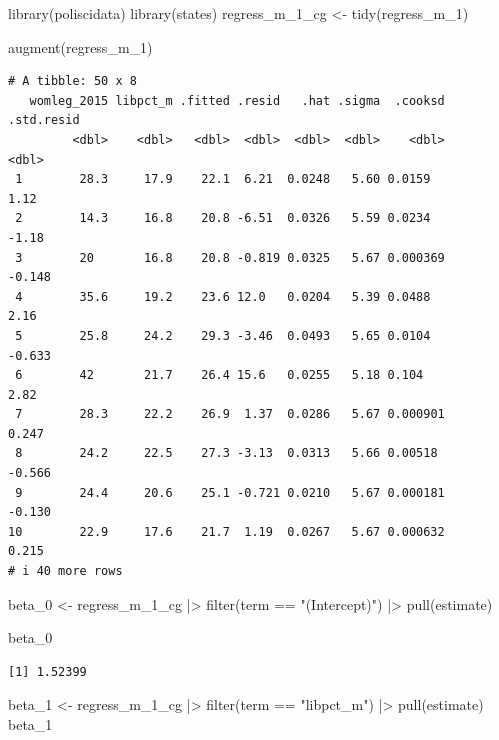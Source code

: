 \documentclass[
  letterpaper,
  DIV=11,
  numbers=noendperiod]{scrartcl}
\newenvironment{Shaded}{\begin{snugshade}}{\end{snugshade}}
\newcommand{\FunctionTok}[1]{\textcolor[rgb]{0.28,0.35,0.67}{#1}}
\newcommand{\NormalTok}[1]{\textcolor[rgb]{0.00,0.23,0.31}{#1}}
\newcommand{\OtherTok}[1]{\textcolor[rgb]{0.00,0.23,0.31}{#1}}
\newcommand{\SpecialCharTok}[1]{\textcolor[rgb]{0.37,0.37,0.37}{#1}}
\newcommand{\StringTok}[1]{\textcolor[rgb]{0.13,0.47,0.30}{#1}}
\begin{document}
\begin{Shaded}
\begin{Highlighting}[]
\FunctionTok{library}\NormalTok{(poliscidata)}
\FunctionTok{library}\NormalTok{(states)}
\NormalTok{regress\_m\_1\_cg }\OtherTok{\textless{}{-}} \FunctionTok{tidy}\NormalTok{(regress\_m\_1)}

\FunctionTok{augment}\NormalTok{(regress\_m\_1)}
\end{Highlighting}
\end{Shaded}

\begin{verbatim}
# A tibble: 50 x 8
   womleg_2015 libpct_m .fitted .resid   .hat .sigma  .cooksd .std.resid
         <dbl>    <dbl>   <dbl>  <dbl>  <dbl>  <dbl>    <dbl>      <dbl>
 1        28.3     17.9    22.1  6.21  0.0248   5.60 0.0159        1.12 
 2        14.3     16.8    20.8 -6.51  0.0326   5.59 0.0234       -1.18 
 3        20       16.8    20.8 -0.819 0.0325   5.67 0.000369     -0.148
 4        35.6     19.2    23.6 12.0   0.0204   5.39 0.0488        2.16 
 5        25.8     24.2    29.3 -3.46  0.0493   5.65 0.0104       -0.633
 6        42       21.7    26.4 15.6   0.0255   5.18 0.104         2.82 
 7        28.3     22.2    26.9  1.37  0.0286   5.67 0.000901      0.247
 8        24.2     22.5    27.3 -3.13  0.0313   5.66 0.00518      -0.566
 9        24.4     20.6    25.1 -0.721 0.0210   5.67 0.000181     -0.130
10        22.9     17.6    21.7  1.19  0.0267   5.67 0.000632      0.215
# i 40 more rows
\end{verbatim}

\begin{Shaded}
\begin{Highlighting}[]
\NormalTok{beta\_0 }\OtherTok{\textless{}{-}}\NormalTok{ regress\_m\_1\_cg }\SpecialCharTok{|\textgreater{}}
  \FunctionTok{filter}\NormalTok{(term }\SpecialCharTok{==} \StringTok{"(Intercept)"}\NormalTok{) }\SpecialCharTok{|\textgreater{}}
  \FunctionTok{pull}\NormalTok{(estimate)}

\NormalTok{beta\_0}
\end{Highlighting}
\end{Shaded}

\begin{verbatim}
[1] 1.52399
\end{verbatim}

\begin{Shaded}
\begin{Highlighting}[]
\NormalTok{beta\_1 }\OtherTok{\textless{}{-}}\NormalTok{ regress\_m\_1\_cg }\SpecialCharTok{|\textgreater{}}
  \FunctionTok{filter}\NormalTok{(term }\SpecialCharTok{==} \StringTok{"libpct\_m"}\NormalTok{) }\SpecialCharTok{|\textgreater{}}
  \FunctionTok{pull}\NormalTok{(estimate)}
\NormalTok{beta\_1}
\end{Highlighting}
\end{Shaded}
\end{document}
